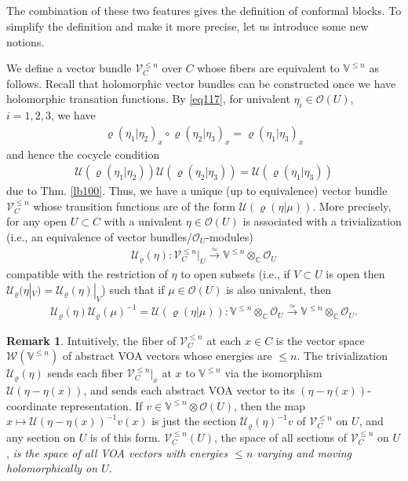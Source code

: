 \documentclass[11pt,b5paper,notitlepage]{article}
\theoremstyle{definition}
\newtheorem{rem}[df]{Remark}
\theoremstyle{plain}
\newcommand{\mc}{\mathcal}
\newcommand{\scr}{\mathscr}
\newcommand{\Vbb}{\mathbb V}
\newcommand{\Cbb}{\mathbb C}
\numberwithin{equation}{section}
\begin{document}
\subsection{}\label{lb119}

The combination of these two features gives the definition of conformal blocks. To simplify the definition and make it more precise, let us introduce some new notions.


We define a vector bundle $\scr V^{\leq n}_C$ \index{V@$\scr V_C^{\leq n},\scr V_C$} over $C$ whose fibers are equivalent to $\Vbb^{\leq n}$ as follows. Recall that holomorphic vector bundles can be constructed once we have holomorphic transation functions. By \eqref{eq117}, for univalent $\eta_i\in\scr O(U)$, $i=1,2,3$, we have
\begin{align}
\varrho(\eta_1|\eta_2)_x\circ\varrho(\eta_2|\eta_3)_x=\varrho(\eta_1|\eta_3)_x	
\end{align}
and hence the cocycle condition
\begin{align}
\mc U(\varrho(\eta_1|\eta_2))\mc U(\varrho(\eta_2|\eta_3))=\mc U(\varrho(\eta_1|\eta_3))	
\end{align}
due to Thm. \ref{lb100}. Thus, we have a unique (up to equivalence) vector bundle $\scr V^{\leq n}_C$ whose transition functions are of the form $\mc U(\varrho(\eta|\mu))$. More precisely, for any open $U\subset C$ with a univalent $\eta\in\scr O(U)$ is associated with a trivialization (i.e., an equivalence of vector bundles/$\scr O_U$-modules) \index{U@$\mc U_\varrho(\eta)$}
\begin{align}
\mc U_\varrho(\eta):\scr V^{\leq n}_C\big|_U\xrightarrow{\simeq}	\Vbb^{\leq n}\otimes_\Cbb\scr O_U\label{eq179}
\end{align}
compatible with the restriction of $\eta$ to open subsets (i.e., if $V\subset U$ is open then $\mc U_\varrho(\eta|_V)=\mc U_\varrho(\eta)|_V$) such that if $\mu\in\scr O(U)$ is also univalent, then
\begin{align}
\mc U_\varrho(\eta)\mc U_\varrho(\mu)^{-1}=\mc U(\varrho(\eta|\mu)):\Vbb^{\leq n}\otimes_\Cbb\scr O_U\xrightarrow{\simeq}	\Vbb^{\leq n}\otimes_\Cbb\scr O_U.\label{eq180}
\end{align}

\begin{rem}\label{lb106}
Intuitively, the fiber of $\scr V^{\leq n}_C$ at each $x\in C$ is the vector space $\scr W(\Vbb^{\leq n})$ of abstract VOA vectors whose energies are $\leq n$. The trivialization $\mc U_\varrho(\eta)$ sends each fiber $\scr V^{\leq n}_C|_x$ at $x$  to $\Vbb^{\leq n}$ via the isomorphism $\mc U(\eta-\eta(x))$, and sends each abstract VOA vector to its $(\eta-\eta(x))$-coordinate representation.  If $v\in\Vbb^{\leq n}\otimes\scr O(U)$, then the map $x\mapsto \mc U(\eta-\eta(x))^{-1}v(x)$ is just the section $\mc U_\varrho(\eta)^{-1}v$ of $\scr V^{\leq n}_C$ on $U$, and any section on $U$ is of this form. $\scr V^{\leq n}_C(U)$, the space of all sections of $\scr V^{\leq n}_C$ on $U$, \emph{is the space of all VOA vectors with energies $\leq n$ varying and moving holomorphically on $U$}. 
\end{rem}
\end{document}
